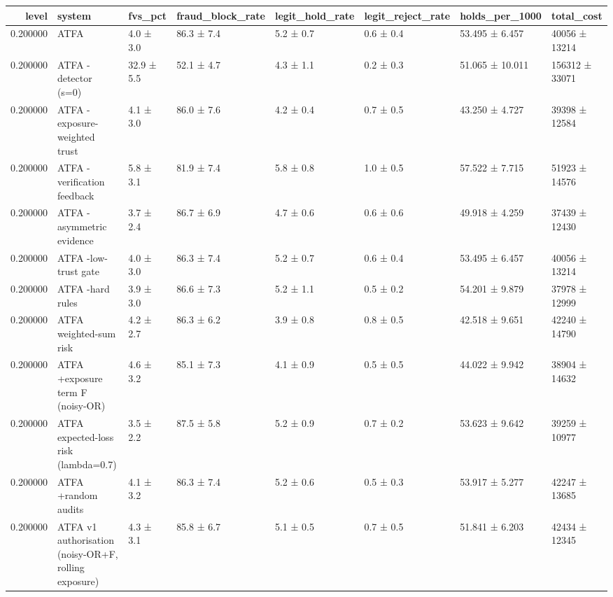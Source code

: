 \begin{tabular}{rlllllll}
\toprule
level & system & fvs\_pct & fraud\_block\_rate & legit\_hold\_rate & legit\_reject\_rate & holds\_per\_1000 & total\_cost \\
\midrule
0.200000 & ATFA & 4.0 ± 3.0 & 86.3 ± 7.4 & 5.2 ± 0.7 & 0.6 ± 0.4 & 53.495 ± 6.457 & 40056 ± 13214 \\
0.200000 & ATFA -detector (s=0) & 32.9 ± 5.5 & 52.1 ± 4.7 & 4.3 ± 1.1 & 0.2 ± 0.3 & 51.065 ± 10.011 & 156312 ± 33071 \\
0.200000 & ATFA -exposure-weighted trust & 4.1 ± 3.0 & 86.0 ± 7.6 & 4.2 ± 0.4 & 0.7 ± 0.5 & 43.250 ± 4.727 & 39398 ± 12584 \\
0.200000 & ATFA -verification feedback & 5.8 ± 3.1 & 81.9 ± 7.4 & 5.8 ± 0.8 & 1.0 ± 0.5 & 57.522 ± 7.715 & 51923 ± 14576 \\
0.200000 & ATFA -asymmetric evidence & 3.7 ± 2.4 & 86.7 ± 6.9 & 4.7 ± 0.6 & 0.6 ± 0.6 & 49.918 ± 4.259 & 37439 ± 12430 \\
0.200000 & ATFA -low-trust gate & 4.0 ± 3.0 & 86.3 ± 7.4 & 5.2 ± 0.7 & 0.6 ± 0.4 & 53.495 ± 6.457 & 40056 ± 13214 \\
0.200000 & ATFA -hard rules & 3.9 ± 3.0 & 86.6 ± 7.3 & 5.2 ± 1.1 & 0.5 ± 0.2 & 54.201 ± 9.879 & 37978 ± 12999 \\
0.200000 & ATFA weighted-sum risk & 4.2 ± 2.7 & 86.3 ± 6.2 & 3.9 ± 0.8 & 0.8 ± 0.5 & 42.518 ± 9.651 & 42240 ± 14790 \\
0.200000 & ATFA +exposure term F (noisy-OR) & 4.6 ± 3.2 & 85.1 ± 7.3 & 4.1 ± 0.9 & 0.5 ± 0.5 & 44.022 ± 9.942 & 38904 ± 14632 \\
0.200000 & ATFA expected-loss risk (lambda=0.7) & 3.5 ± 2.2 & 87.5 ± 5.8 & 5.2 ± 0.9 & 0.7 ± 0.2 & 53.623 ± 9.642 & 39259 ± 10977 \\
0.200000 & ATFA +random audits & 4.1 ± 3.2 & 86.3 ± 7.4 & 5.2 ± 0.6 & 0.5 ± 0.3 & 53.917 ± 5.277 & 42247 ± 13685 \\
0.200000 & ATFA v1 authorisation (noisy-OR+F, rolling exposure) & 4.3 ± 3.1 & 85.8 ± 6.7 & 5.1 ± 0.5 & 0.7 ± 0.5 & 51.841 ± 6.203 & 42434 ± 12345 \\
\bottomrule
\end{tabular}
